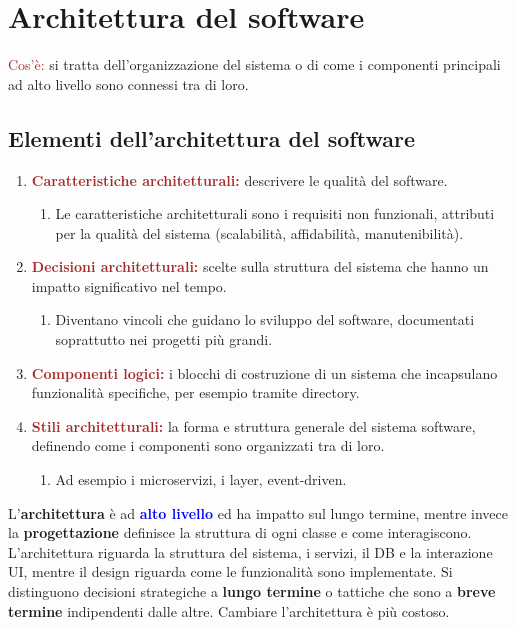 \chapter{Architettura del software}
\begin{boxDef}
\textcolor{brown}{Cos'è:} si tratta dell'organizzazione del sistema o di come i componenti principali ad alto livello sono connessi tra di loro.
\end{boxDef}

\section{Elementi dell'architettura del software}
\begin{enumerate}
    \item \textbf{\textcolor{brown}{Caratteristiche architetturali:}} descrivere le qualità del software.
    \begin{enumerate}
        \item Le caratteristiche architetturali sono i requisiti non funzionali, attributi per la qualità del sistema (scalabilità, affidabilità, manutenibilità).
    \end{enumerate}
    \item \textbf{\textcolor{brown}{Decisioni architetturali:}} scelte sulla struttura del sistema che hanno un impatto significativo nel tempo.
    \begin{enumerate}
        \item Diventano vincoli che guidano lo sviluppo del software, documentati soprattutto nei progetti più grandi.
    \end{enumerate}
    \item \textbf{\textcolor{brown}{Componenti logici:}} i blocchi di costruzione di un sistema che incapsulano funzionalità specifiche, per esempio tramite directory.
    \item \textbf{\textcolor{brown}{Stili architetturali:}} la forma e struttura generale del sistema software, definendo come i componenti sono organizzati tra di loro.
    \begin{enumerate}
        \item Ad esempio i microservizi, i layer, event-driven.
    \end{enumerate}
\end{enumerate}

L'\textbf{architettura} è ad \textbf{\textcolor{blue}{alto livello}} ed ha impatto sul lungo termine, mentre invece la \textbf{progettazione} definisce la struttura di ogni classe e come interagiscono.
L'architettura riguarda la struttura del sistema, i servizi, il DB e la interazione UI, mentre il design riguarda come le funzionalità sono implementate.
Si distinguono decisioni strategiche a \textbf{lungo termine} o tattiche che sono a \textbf{breve termine} indipendenti dalle altre. Cambiare l'architettura è più costoso.

